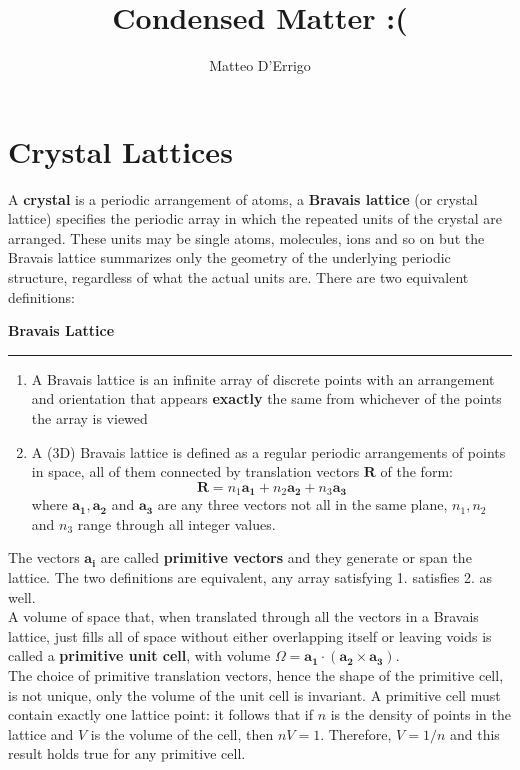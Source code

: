 \documentclass[10.75pt,a4paper,openright,bottom=2cm]{article}
\title{\textbf{Condensed Matter :(}}
\author{Matteo D'Errigo}
\renewcommand{\Vec}[1]{\boldsymbol{#1}}
\begin{document}
\maketitle
\tableofcontents
\newpage
\section{Crystal Lattices}
A \textbf{crystal} is a periodic arrangement of atoms, a \textbf{Bravais lattice} (or crystal lattice) specifies the periodic array in which the repeated units of the crystal are arranged. These units may be single atoms, molecules, ions and so on but the Bravais lattice summarizes only the geometry of the underlying periodic structure, regardless of what the actual units are. There are two equivalent definitions:
\begin{mybox}
\textbf{Bravais Lattice {\color{blue!30}{g}}}
\hrule
\begin{enumerate}
    \item A Bravais lattice is an infinite array of discrete points with an arrangement and orientation that appears \textbf{exactly} the same from whichever of the points the array is viewed
    \item A (3D) Bravais lattice is defined as a regular periodic arrangements of points in space, all of them connected by translation vectors $\Vec{R}$ of the form:
    \[
    \Vec{R}=n_1\Vec{a_1}+n_2\Vec{a_2}+n_3\Vec{a_3}
    \]
    where $\Vec{a_1}, \Vec{a_2}$ and $\Vec{a_3}$ are any three vectors not all in the same plane, $n_1, n_2$ and $n_3$ range through all integer values.
\end{enumerate}
\end{mybox}
\noindent
The vectors $\Vec{a_i}$ are called \textbf{primitive vectors} and they generate or span the lattice. The two definitions are equivalent, any array satisfying 1. satisfies 2. as well.\\
A volume of space that, when translated through all the vectors in a Bravais lattice, just fills all of space without either overlapping itself or leaving voids is called a \textbf{primitive unit cell}, with volume $\Omega=\Vec{a_1}\cdot(\Vec{a_2}\times\Vec{a_3})$.\\
The choice of primitive translation vectors, hence the shape of the primitive cell, is not unique, only the volume of the unit cell is invariant. A primitive cell must contain exactly one lattice point: it follows that if $n$ is the density of points in the lattice and $V$ is the volume of the cell, then $nV=1$. Therefore, $V=1/n$ and this result holds true for any primitive cell.\\
\end{document}
